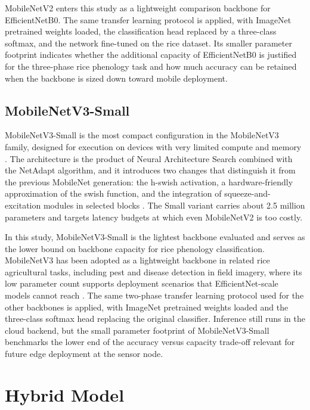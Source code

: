 MobileNetV2 enters this study as a lightweight comparison backbone for EfficientNetB0. The same transfer learning protocol is applied, with ImageNet pretrained weights loaded, the classification head replaced by a three-class softmax, and the network fine-tuned on the rice dataset. Its smaller parameter footprint indicates whether the additional capacity of EfficientNetB0 is justified for the three-phase rice phenology task and how much accuracy can be retained when the backbone is sized down toward mobile deployment.

\subsection{MobileNetV3-Small}

MobileNetV3-Small is the most compact configuration in the MobileNetV3 family, designed for execution on devices with very limited compute and memory \cite{howard2019mobilenetv3}. The architecture is the product of Neural Architecture Search combined with the NetAdapt algorithm, and it introduces two changes that distinguish it from the previous MobileNet generation: the h-swish activation, a hardware-friendly approximation of the swish function, and the integration of squeeze-and-excitation modules in selected blocks \cite{howard2019mobilenetv3}. The Small variant carries about 2.5 million parameters and targets latency budgets at which even MobileNetV2 is too costly.

In this study, MobileNetV3-Small is the lightest backbone evaluated and serves as the lower bound on backbone capacity for rice phenology classification. MobileNetV3 has been adopted as a lightweight backbone in related rice agricultural tasks, including pest and disease detection in field imagery, where its low parameter count supports deployment scenarios that EfficientNet-scale models cannot reach \cite{jia2023ricemobilenetv3}. The same two-phase transfer learning protocol used for the other backbones is applied, with ImageNet pretrained weights loaded and the three-class softmax head replacing the original classifier. Inference still runs in the cloud backend, but the small parameter footprint of MobileNetV3-Small benchmarks the lower end of the accuracy versus capacity trade-off relevant for future edge deployment at the sensor node.

\section{Hybrid Model}

